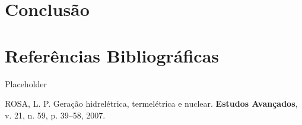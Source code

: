 \documentclass[grad,numbers]{coppe}
\newenvironment{cslreferences}%
  {}%
  {\par}
\begin{document}
  \hypertarget{conclusuxe3o}{%
  \chapter{Conclusão}\label{conclusuxe3o}}

  \hypertarget{referuxeancias-bibliogruxe1ficas}{%
  \chapter*{Referências Bibliográficas}\label{referuxeancias-bibliogruxe1ficas}}

  Placeholder

  \hypertarget{refs}{}
  \begin{cslreferences}
  \leavevmode\hypertarget{ref-rosa2007}{}%
  ROSA, L. P. Geração hidrelétrica, termelétrica e nuclear. \textbf{Estudos Avançados}, v. 21, n. 59, p. 39--58, 2007.
  \end{cslreferences}
  \backmatter
  
  

\end{document}
